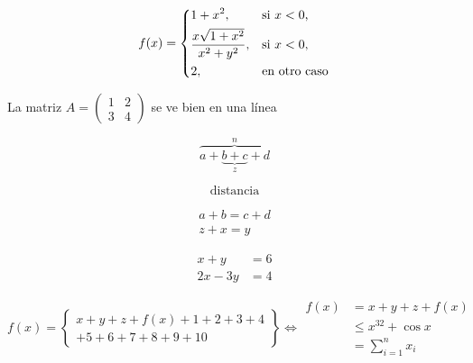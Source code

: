 \documentclass{article}
\DeclareMathOperator{\dist}{distancia}
\begin{document}
\[
f(x) =
\begin{dcases}
1+x^2, & \text{si $x<0$,}\\
\frac{x\sqrt{1+x^2}}{x^2+y^2}, & \text{si } x<0, \\
2, & \text{en otro caso}
\end{dcases}
\]

La matriz $A =
  \left(
  \begin{smallmatrix}
  1 & 2 \\
  3 & 4
  \end{smallmatrix}
  \right)$ se ve bien en una línea

\[
 \overbrace{a+\underbrace{b+c}_{z}+d}^{n}
\]

\[
\dist
\]

\begin{gather*}
    a+b=c+d \\
    z+x=y
\end{gather*}

\begin{align*}
x+y & = 6 \\
2x-3y & = 4
\end{align*}

\begin{equation}\label{eq:gather}
    f(x) = \left\{
        \begin{gathered}
            x+y+z+f(x)+1+2+3+4 \\
            +5+6+7+8+9+10
        \end{gathered}
        \right\}
        \iff
        \begin{aligned}
            f(x) & = x+y+z+f(x) \\
                    & \leq x^{32}+\cos{x} \\
                    & = \sum_{i=1}^{n} x_i
        \end{aligned}
\end{equation}
\end{document}
